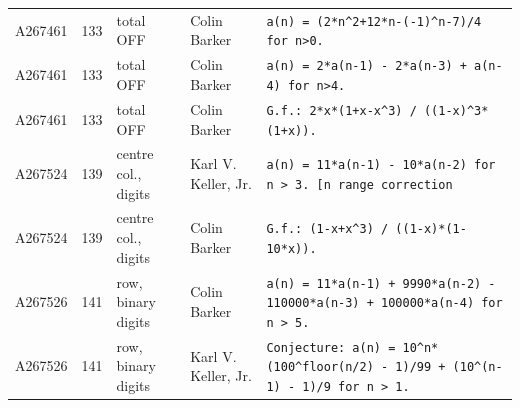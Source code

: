 \documentclass[11pt]{article}
\theoremstyle{definition}
\theoremstyle{remark}
\begin{document}
{\begin{longtable}{p{1.3cm}p{0.7cm}p{2.4cm}p{2.3cm}p{7.3cm}}
A267461 & 133 & total OFF & Colin Barker & \texttt{a(n)\allowbreak{} \allowbreak{}=\allowbreak{} \allowbreak{}(2*\allowbreak{}n\^{}2+\allowbreak{}12*\allowbreak{}n-\allowbreak{}(-\allowbreak{}1)\allowbreak{}\^{}n-\allowbreak{}7)\allowbreak{}/\allowbreak{}4 \allowbreak{}for \allowbreak{}n>0.} \\
A267461 & 133 & total OFF & Colin Barker & \texttt{a(n)\allowbreak{} \allowbreak{}=\allowbreak{} \allowbreak{}2*\allowbreak{}a(n-\allowbreak{}1)\allowbreak{} \allowbreak{}-\allowbreak{} \allowbreak{}2*\allowbreak{}a(n-\allowbreak{}3)\allowbreak{} \allowbreak{}+\allowbreak{} \allowbreak{}a(n-\allowbreak{}4)\allowbreak{} \allowbreak{}for \allowbreak{}n>4.} \\
A267461 & 133 & total OFF & Colin Barker & \texttt{G.f.: \allowbreak{}2*\allowbreak{}x*\allowbreak{}(1+\allowbreak{}x-\allowbreak{}x\^{}3)\allowbreak{} \allowbreak{}/\allowbreak{} \allowbreak{}((1-\allowbreak{}x)\allowbreak{}\^{}3*\allowbreak{}(1+\allowbreak{}x)\allowbreak{})\allowbreak{}.} \\
A267524 & 139 & centre col., digits & Karl V. Keller, Jr. & \texttt{a(n)\allowbreak{} \allowbreak{}=\allowbreak{} \allowbreak{}11*\allowbreak{}a(n-\allowbreak{}1)\allowbreak{} \allowbreak{}-\allowbreak{} \allowbreak{}10*\allowbreak{}a(n-\allowbreak{}2)\allowbreak{} \allowbreak{}for \allowbreak{}n \allowbreak{}> \allowbreak{}3. \allowbreak{}[n \allowbreak{}range \allowbreak{}correction} \\
A267524 & 139 & centre col., digits & Colin Barker & \texttt{G.f.: \allowbreak{}(1-\allowbreak{}x+\allowbreak{}x\^{}3)\allowbreak{} \allowbreak{}/\allowbreak{} \allowbreak{}((1-\allowbreak{}x)\allowbreak{}*\allowbreak{}(1-\allowbreak{}10*\allowbreak{}x)\allowbreak{})\allowbreak{}.} \\
A267526 & 141 & row, binary digits & Colin Barker & \texttt{a(n)\allowbreak{} \allowbreak{}=\allowbreak{} \allowbreak{}11*\allowbreak{}a(n-\allowbreak{}1)\allowbreak{} \allowbreak{}+\allowbreak{} \allowbreak{}9990*\allowbreak{}a(n-\allowbreak{}2)\allowbreak{} \allowbreak{}-\allowbreak{} \allowbreak{}110000*\allowbreak{}a(n-\allowbreak{}3)\allowbreak{} \allowbreak{}+\allowbreak{} \allowbreak{}100000*\allowbreak{}a(n-\allowbreak{}4)\allowbreak{} \allowbreak{}for \allowbreak{}n \allowbreak{}> \allowbreak{}5.} \\
A267526 & 141 & row, binary digits & Karl V. Keller, Jr. & \texttt{Conjecture: \allowbreak{}a(n)\allowbreak{} \allowbreak{}=\allowbreak{} \allowbreak{}10\^{}n*\allowbreak{}(100\^{}floor(n/\allowbreak{}2)\allowbreak{} \allowbreak{}-\allowbreak{} \allowbreak{}1)\allowbreak{}/\allowbreak{}99 \allowbreak{}+\allowbreak{} \allowbreak{}(10\^{}(n-\allowbreak{}1)\allowbreak{} \allowbreak{}-\allowbreak{} \allowbreak{}1)\allowbreak{}/\allowbreak{}9 \allowbreak{}for \allowbreak{}n \allowbreak{}> \allowbreak{}1.} \\

\end{longtable}}
\end{document}
